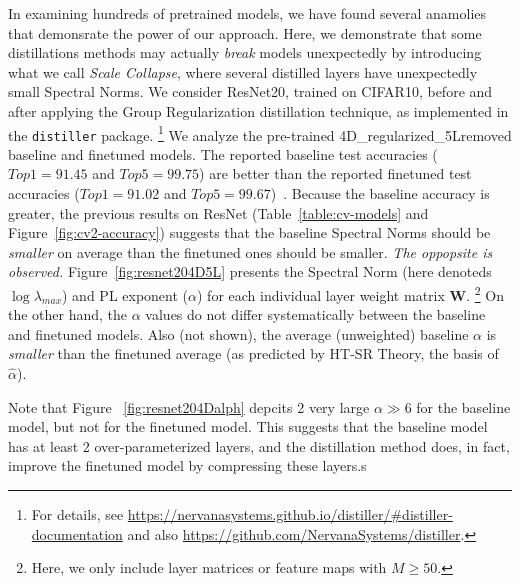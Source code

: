 In examining hundreds of pretrained models, we have found several anamolies that demonsrate the power of our approach.
Here, we demonstrate that some distillations methods may actually \emph{break} models unexpectedly by introducing what we call \emph{Scale Collapse},
where several distilled layers have unexpectedly small Spectral Norms.
We consider ResNet20, trained on CIFAR10, before and after applying the Group Regularization distillation technique, as implemented in the \texttt{distiller} package.%
\footnote{For details, see \url{https://nervanasystems.github.io/distiller/\#distiller-documentation} and also \url{https://github.com/NervanaSystems/distiller}.}
We analyze the pre-trained 4D\_regularized\_5Lremoved baseline and finetuned models.  %
The reported baseline test accuracies ($Top1=91.45$ and $Top5=99.75$) are better than the reported finetuned test accuracies ($Top1=91.02$ and $Top5=99.67$)~\cite{XXX-XXX}.  Because the baseline accuracy is greater,  the previous results on ResNet (Table~\ref{table:cv-models} and Figure~\ref{fig:cv2-accuracy}) suggests that the baseline Spectral Norms should be \emph{smaller} on average than the finetuned ones should be smaller.
\emph{The oppopsite is observed.}
Figure~\ref{fig:resnet204D5L} presents the Spectral Norm (here denoteds $\log\lambda_{max}$) and PL exponent ($\alpha$) for each individual layer weight matrix $\mathbf{W}$.%
\footnote{Here, we only include layer matrices or feature maps with $M\ge50$.}
On the other hand, the $\alpha$ values do not differ systematically between the baseline and finetuned models.
Also (not shown), the average (unweighted) baseline $\alpha$ is \emph{smaller} than the finetuned average (as predicted by HT-SR Theory, the basis of $\hat{\alpha}$).

Note that Figure ~\ref{fig:resnet204Dalph} depcits 2 very large $\alpha\gg 6$ for the baseline model, but not for the finetuned model.
This suggests that the baseline model has at least 2 over-parameterized layers, and the distillation method does, in fact, 
improve the finetuned model by compressing these layers.s

